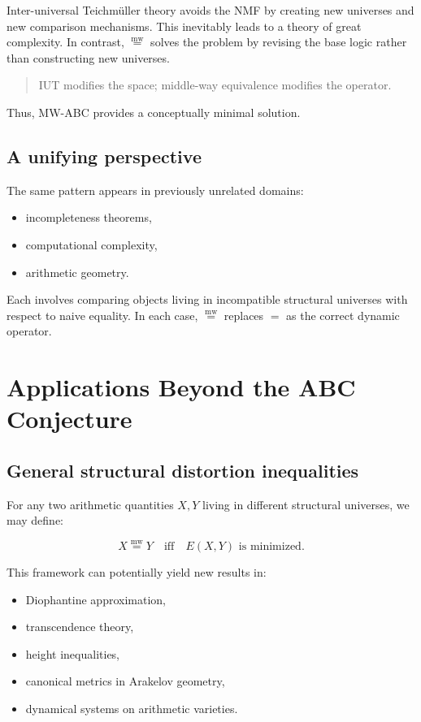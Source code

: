 \documentclass[11pt]{article}
\newcommand{\mweq}{\mathrel{\overset{\mathrm{mw}}{=}}}
\theoremstyle{definition}
\theoremstyle{remark}
\begin{document}
Inter-universal Teichmüller theory avoids the NMF by creating new
universes and new comparison mechanisms. This inevitably leads to a
theory of great complexity. In contrast, $\mweq$ solves the problem by
revising the base logic rather than constructing new universes.

\begin{quote}
IUT modifies the space; middle-way equivalence modifies the operator.
\end{quote}

Thus, MW-ABC provides a conceptually minimal solution.

\subsection{A unifying perspective}

The same pattern appears in previously unrelated domains:

\begin{itemize}
  \item incompleteness theorems,
  \item computational complexity,
  \item arithmetic geometry.
\end{itemize}

Each involves comparing objects living in incompatible structural
universes with respect to naive equality. In each case, $\mweq$
replaces $=$ as the correct dynamic operator.

\section{Applications Beyond the ABC Conjecture}

\subsection{General structural distortion inequalities}

For any two arithmetic quantities $X, Y$ living in different structural
universes, we may define:

\[
  X \mweq Y
  \quad\text{iff}\quad
  E(X,Y) \text{ is minimized}.
\]

This framework can potentially yield new results in:

\begin{itemize}
  \item Diophantine approximation,
  \item transcendence theory,
  \item height inequalities,
  \item canonical metrics in Arakelov geometry,
  \item dynamical systems on arithmetic varieties.
\end{itemize}
\end{document}
